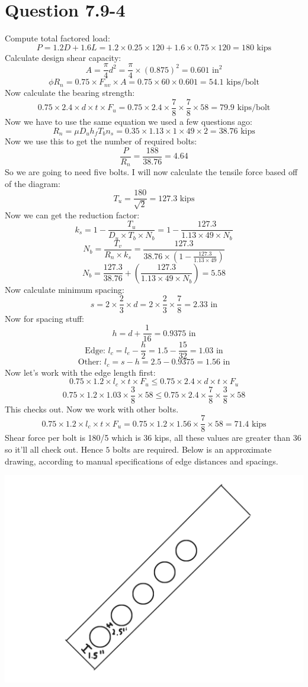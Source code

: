 \documentclass{article}
\begin{document}
\section*{Question 7.9-4}
Compute total factored load: 
\[P=1.2D+1.6L=1.2\times 0.25\times 120 + 1.6\times 0.75\times 120=180\text{ kips}\]
Calculate design shear capacity: 
\[A=\frac{\pi}{4}d^2=\frac{\pi}{4}\times (0.875)^2=0.601\text{ in}^2\]
\[\phi R_n=0.75\times F_{nv}\times A = 0.75\times 60\times 0.601 = 54.1\text{ kips/bolt}\] 
Now calculate the bearing strength: 
\[0.75\times 2.4\times d\times t\times F_u= 0.75\times 2.4\times \frac{7}{8} \times \frac{7}{8} \times 58=79.9\text{ kips/bolt}\]
Now we have to use the same equation we used a few questions ago: 
\[R_n=\mu D_u h_f T_b n_s=0.35\times 1.13\times 1\times 49\times 2=38.76\text{ kips}\] 
Now we use this to get the number of required bolts: 
\[\frac{P}{R_n}=\frac{188}{38.76}=4.64\] 
So we are going to need five bolts. I will now calculate the tensile force based off of the diagram:
\[T_u=\frac{180}{\sqrt{2}}=127.3\text{ kips}\] 
Now we can get the reduction factor: 
\[k_s=1-\frac{T_u}{D_u\times T_b\times N_b}=1-\frac{127.3}{1.13\times 49\times N_b}\]
\[N_b=\frac{T_v}{R_n\times k_s}=\frac{127.3}{38.76\times \left(1-\frac{127.3}{1.13\times 49}\right)}\]
\[N_b=\frac{127.3}{38.76}+\left(\frac{127.3}{1.13\times 49\times N_b}\right)=5.58\]
Now calculate minimum spacing: 
\[s=2\times \frac{2}{3}\times d=2\times \frac{2}{3}\times \frac{7}{8}=2.33\text{ in}\]
Now for spacing stuff:
\[h=d+\frac{1}{16}=0.9375\text{ in}\]
\[\text{Edge: }l_c=l_e-\frac{h}{2}=1.5-\frac{15}{32}=1.03\text{ in}\] 
\[\text{Other: }l_c=s-h=2.5-0.9375=1.56\text{ in}\] 
Now let's work with the edge length first: 
\[0.75\times 1.2\times l_c\times t\times F_u \leq 0.75\times 2.4\times d\times t\times F_u\] 
\[0.75\times 1.2\times 1.03\times \frac{3}{8}\times 58 \leq 0.75\times 2.4\times \frac{7}{8}\times \frac{3}{8}\times 58\] 
This checks out. Now we work with other bolts. 
\[0.75\times 1.2\times l_c\times t\times F_u=0.75\times 1.2\times 1.56\times \frac{7}{8}\times 58=71.4\text{ kips}\] 
Shear force per bolt is 180/5 which is 36 kips, all these values are greater than 36 so it'll all check out. Hence $\boxed{5}$ bolts are required. Below is an approximate drawing, according to manual specifications of edge distances and spacings. 
\begin{center}
    \includegraphics*[scale=0.4]{fig2.png}
\end{center}
\end{document}
